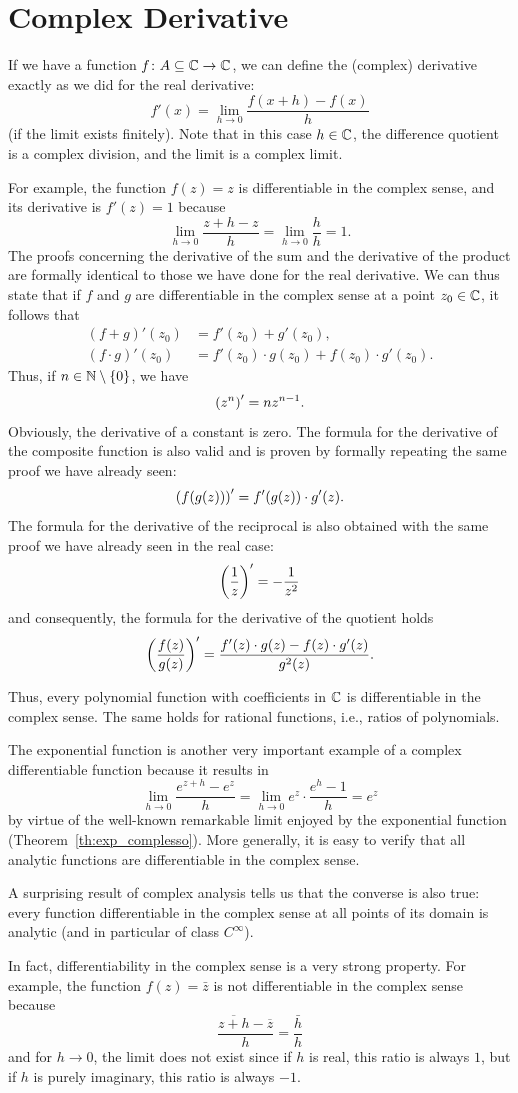 \section{Complex Derivative}
\label{sec:derivata_complessa}

If we have a function $f\colon A\subseteq {\mathbb C} \to {\mathbb C}$, we can define the
(complex) derivative exactly as we did for the real derivative:
\[
  f'(x) = \lim_{h\to 0} \frac{f(x+h)-f(x)}{h}
\]
(if the limit exists finitely). Note that in this case $h\in {\mathbb C}$, the
difference quotient is a complex division, and the limit is a complex limit.

For example, the function $f(z)=z$ is differentiable in the complex sense, and
its derivative is $f'(z) = 1$ because
\[
  \lim_{h\to 0} \frac{z+h-z}{h} = \lim_{h\to 0} \frac{h}{h}=1.
\]
The proofs concerning the derivative of the sum and the derivative of the
product are formally identical to those we have done for the real derivative. We
can thus state that if $f$ and $g$ are differentiable in the complex sense at a
point $z_0\in {\mathbb C}$, it follows that
\begin{align*}
  (f+g)'(z_0) 
    &= f'(z_0) + g'(z_0), \\
  (f\cdot g)'(z_0) 
    &= f'(z_0)\cdot g(z_0) + f(z_0)\cdot g'(z_0).
\end{align*}
Thus, if $n\in {\mathbb N}\setminus{\left\{ 0 \right\}}$, we have
\[
  {\left( z^n \right)}' = n z^{n-1}.
\]
Obviously, the derivative of a constant is zero. The formula for the derivative
of the composite function is also valid and is proven by formally repeating the
same proof we have already seen:
\[
  {\left( f(g(z)) \right)}'  = f'(g(z))\cdot g'(z).
\]
The formula for the derivative of the reciprocal is also obtained with the same
proof we have already seen in the real case:
\[
  {\left( \frac 1 z \right)}' = - \frac{1}{z^2}
\]
and consequently, the formula for the derivative of the quotient holds
\[
{\left( \frac{f(z)}{g(z)} \right)}' = \frac{f'(z)\cdot g(z) - f(z)\cdot g'(z)}{g^2(z)}.
\]

Thus, every polynomial function with coefficients in ${\mathbb C}$ is differentiable in
the complex sense. The same holds for rational functions, i.e., ratios of
polynomials.

The exponential function is another very important example of a complex
differentiable function because it results in
\[
  \lim_{h\to 0} \frac{e^{z+h}-e^z}{h}
  = \lim_{h\to 0} e^z \cdot \frac{e^h-1}{h} = e^z
\]
by virtue of the well-known remarkable limit enjoyed by the exponential function
(Theorem~\ref{th:exp_complesso}). More generally, it is easy to verify that all
analytic functions are differentiable in the complex sense.

A surprising result of complex analysis tells us that the converse is also true:
every function differentiable in the complex sense at all points of its domain
is analytic (and in particular of class $C^\infty$).

In fact, differentiability in the complex sense is a very strong property. For
example, the function $f(z) = \bar z$ is not differentiable in the complex sense
because
\[
\frac{\overline{z+h}-\overline z}{h} = \frac{\bar h}{h}
\]
and for $h\to 0$, the limit does not exist since if $h$ is real, this ratio is
always $1$, but if $h$ is purely imaginary, this ratio is always $-1$.